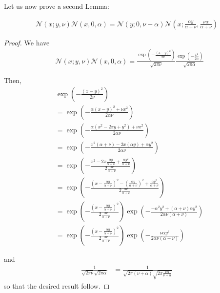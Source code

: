 Let us now prove a second Lemma:
\begin{lemma}
  \label{lemma:multgauss}
  \begin{align*}
    \mathcal{N}(x; y, \nu) \mathcal{N}(x, 0, \alpha) = \mathcal{N}(y; 0, \nu + \alpha) \mathcal{N}(x; \frac{\alpha y}{\alpha + \nu}, \frac{\nu \alpha}{\alpha + \nu})
  \end{align*}
\end{lemma}
\begin{proof}

  We have 
\begin{align}
  &\mathcal{N}(x; y, \nu) \mathcal{N}(x, 0, \alpha) = \frac{\exp \left(-\frac{(x-y)^2}{2\nu} \right)}{\sqrt{2 \pi \nu}} \frac{\exp \left(-\frac{x^2}{2\alpha}\right)}{\sqrt{2 \pi \alpha}}
\end{align}

Then,
\begin{align}
  &\exp \left(-\frac{(x-y)^2}{2\nu} \right) \\
  &= \exp\left(- \frac{\alpha (x-y)^2 + \nu x^2}{2 \alpha \nu} \right) \\
  &= \exp\left(- \frac{\alpha (x^2 -2xy + y^2) + \nu x^2}{2 \alpha \nu} \right) \\ 
  &=\exp\left(- \frac{x^2(\alpha + \nu) -2x(\alpha y) + \alpha y^2 }{2 \alpha \nu} \right) \\
  &= \exp\left( -\frac{x^2 -2x\frac{\alpha y}{\alpha + \nu} + \frac{\alpha y^2}{\alpha + \nu} }{2 \frac{\alpha \nu}{\alpha + \nu}} \right) \\
  &= \exp\left( -\frac{(x - \frac{\alpha y}{\alpha + \nu})^2 - ( \frac{\alpha y}{\alpha + \nu} )^2 + \frac{\alpha y^2}{\alpha + \nu} }{2 \frac{\alpha \nu}{\alpha + \nu}} \right) \\
  &= \exp\left( -\frac{(x - \frac{\alpha y}{\alpha + \nu})^2}{2\frac{\alpha \nu}{\alpha + \nu}}\right) \exp \left(-\frac{ - \alpha^2 y^2 + (\alpha + \nu)\alpha y^2 }{2 \alpha \nu(\alpha + \nu)} \right) \\
  &= \exp\left( -\frac{(x - \frac{\alpha y}{\alpha + \nu})^2}{2\frac{\alpha \nu}{\alpha + \nu}}\right) \exp \left(-\frac{\nu\alpha y^2 }{2 \alpha \nu(\alpha + \nu)} \right)
\end{align}

and
\begin{align}
  \frac1{\sqrt{2 \pi \nu}\sqrt{2 \pi \alpha}} &= \frac1{\sqrt{2 \pi (\nu + \alpha)}\sqrt{2 \pi \frac{\nu \alpha}{\nu + \alpha}}}
\end{align}
so that the desired result follow.
\end{proof}
                 
